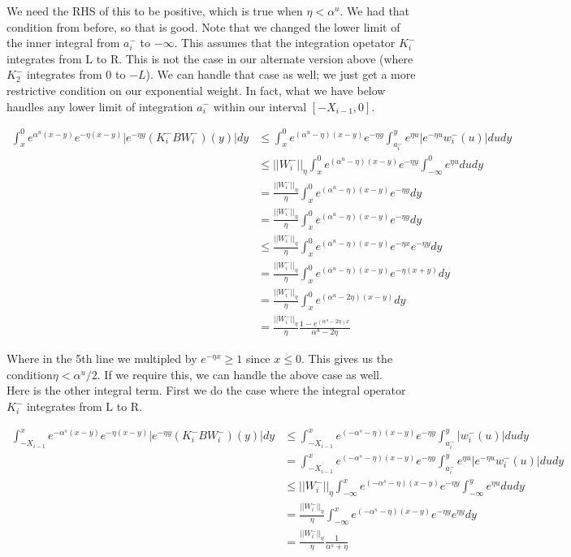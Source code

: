 \documentclass[12pt]{article}
\begin{document}
We need the RHS of this to be positive, which is true when $\eta < \alpha^u$. We had that condition from before, so that is good. Note that we changed the lower limit of the inner integral from $a_i^-$ to $-\infty$. This assumes that the integration opetator $K_i^-$ integrates from L to R. This is not the case in our alternate version above (where $K_2^-$ integrates from 0 to $-L$). We can handle that case as well; we just get a more restrictive condition on our exponential weight. In fact, what we have below handles any lower limit of integration $a_i^-$ within our interval $[-X_{i-1}, 0]$.

\begin{align*}
\int_x^0 e^{\alpha^u (x-y)}e^{-\eta(x-y)}|e^{-\eta y} (K_i^- B W_i^-)(y)| dy &\leq \int_x^0 e^{(\alpha^u - \eta)(x-y)}e^{-\eta y} \int_{a_i^-}^y e^{\eta u} |e^{-\eta u} w_i^-(u)| du dy \\
&\leq ||W_i^-||_\eta \int_x^0 e^{(\alpha^u - \eta)(x-y)}e^{-\eta y} \int_{-\infty}^0 e^{\eta u} du dy \\
&= \frac{||W_i^-||_\eta}{\eta} \int_x^0 e^{(\alpha^u - \eta)(x-y)}e^{-\eta y} dy \\
&= \frac{||W_i^-||_\eta}{\eta} \int_x^0 e^{(\alpha^u - \eta)(x-y)}e^{-\eta y} dy \\
&\leq \frac{||W_i^-||_\eta}{\eta} \int_x^0 e^{(\alpha^u - \eta)(x-y)}e^{-\eta x}e^{-\eta y} dy \\
&=\frac{||W_i^-||_\eta}{\eta} \int_x^0 e^{(\alpha^u - \eta)(x-y)}e^{-\eta(x+y)} dy \\
&=\frac{||W_i^-||_\eta}{\eta} \int_x^0 e^{(\alpha^u - 2 \eta)(x-y)} dy \\
&= \frac{||W_i^-||_\eta}{\eta} \frac{1 - e^{(\alpha^u - 2 \eta)x}}{\alpha^u - 2 \eta} 
\end{align*}

Where in the 5th line we multipled by $e^{-\eta x} \geq 1$ since $x \leq 0$. This gives us the condition$\eta < \alpha^u/2$. If we require this, we can handle the above case as well.\\

Here is the other integral term. First we do the case where the integral operator $K_i^-$ integrates from L to R.

\begin{align*}
\int_{-X_{i-1}}^x e^{-\alpha^s (x-y)}e^{-\eta(x-y)}|e^{-\eta y} (K_i^- B W_i^-)(y)| dy &\leq \int_{-X_{i-1}}^x e^{(-\alpha^s - \eta)(x-y)}e^{-\eta y} \int_{a_i^-}^y |w_i^-(u)| du dy \\
&= \int_{-X_{i-1}}^x e^{(-\alpha^s - \eta)(x-y)}e^{-\eta y} \int_{a_i^-}^y e^{\eta u} |e^{-\eta u} w_i^-(u)| du dy \\
&\leq ||W_i^-||_\eta \int_{-\infty}^x e^{(-\alpha^s - \eta)(x-y)}e^{-\eta y} \int_{-\infty}^y e^{\eta u} du dy \\
&= \frac{||W_i^-||_\eta}{\eta} \int_{-\infty}^x e^{(-\alpha^s - \eta)(x-y)}e^{-\eta y} e^{\eta y} dy \\
&= \frac{||W_i^-||_\eta}{\eta} \frac{1}{\alpha^s + \eta}
\end{align*}
\end{document}
